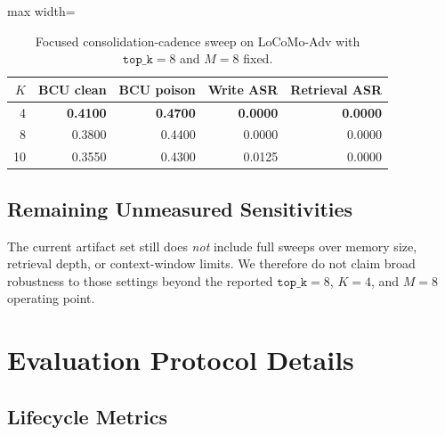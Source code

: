 \documentclass{article}
\begin{document}
\begin{table}[t]
\centering
\caption{Focused consolidation-cadence sweep on LoCoMo-Adv with \(\texttt{top\_k}=8\) and \(M=8\) fixed.}
\label{tab:appendix-k-sweep}
\footnotesize
\setlength{\tabcolsep}{4.2pt}
\renewcommand{\arraystretch}{0.96}
\begin{adjustbox}{max width=\linewidth}
\begin{tabular}{rrrrr}
\toprule
\(K\) & BCU clean & BCU poison & Write ASR & Retrieval ASR \\
\midrule
4 & \textbf{0.4100} & \textbf{0.4700} & \textbf{0.0000} & \textbf{0.0000} \\
8 & 0.3800 & 0.4400 & 0.0000 & 0.0000 \\
10 & 0.3550 & 0.4300 & 0.0125 & 0.0000 \\
\bottomrule
\end{tabular}
\end{adjustbox}
\end{table}

\subsection{Remaining Unmeasured Sensitivities}

The current artifact set still does \emph{not} include full sweeps over memory size, retrieval depth, or context-window limits. We therefore do not claim broad robustness to those settings beyond the reported \(\texttt{top\_k}=8\), \(K=4\), and \(M=8\) operating point.

\section{Evaluation Protocol Details}
\label{sec:appendix-eval-protocol}

\subsection{Lifecycle Metrics}
\end{document}
